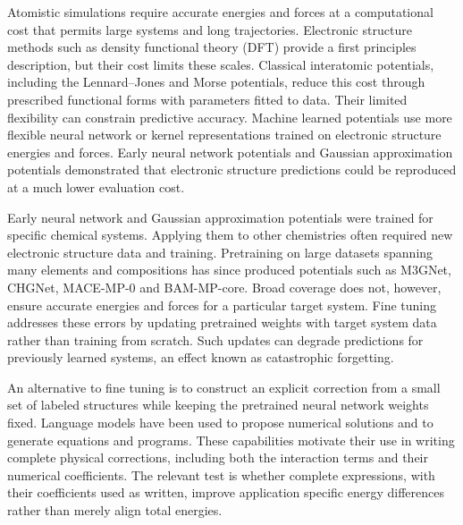 Atomistic simulations require accurate energies and forces at a computational cost that permits large systems and long trajectories. Electronic structure methods such as density functional theory (DFT) provide a first principles description, but their cost limits these scales. Classical interatomic potentials, including the Lennard--Jones and Morse potentials, reduce this cost through prescribed functional forms with parameters fitted to data.\cite{jones1924fields,morse1929} Their limited flexibility can constrain predictive accuracy.\cite{batzner2022} Machine learned potentials use more flexible neural network or kernel representations trained on electronic structure energies and forces. Early neural network potentials and Gaussian approximation potentials demonstrated that electronic structure predictions could be reproduced at a much lower evaluation cost.\cite{behler2007hdnn,bartok2010gap}

Early neural network and Gaussian approximation potentials were trained for specific chemical systems. Applying them to other chemistries often required new electronic structure data and training.\cite{chen2022m3gnet} Pretraining on large datasets spanning many elements and compositions has since produced potentials such as M3GNet, CHGNet, MACE-MP-0 and BAM-MP-core.\cite{chen2022m3gnet,deng2023chgnet,batatia2025macemp0,willow2026bam} Broad coverage does not, however, ensure accurate energies and forces for a particular target system.\cite{deng2025softening,focassio2025surfaces} Fine tuning addresses these errors by updating pretrained weights with target system data rather than training from scratch.\cite{radova2025frozen} Such updates can degrade predictions for previously learned systems, an effect known as catastrophic forgetting.\cite{kim2025reewc}

An alternative to fine tuning is to construct an explicit correction from a small set of labeled structures while keeping the pretrained neural network weights fixed. Language models have been used to propose numerical solutions\cite{vacareanu2024words,yang2024opro} and to generate equations and programs.\cite{merler2024icsr,shojaee2025llmsr,romera2024funsearch} These capabilities motivate their use in writing complete physical corrections, including both the interaction terms and their numerical coefficients. The relevant test is whether complete expressions, with their coefficients used as written, improve application specific energy differences rather than merely align total energies.

